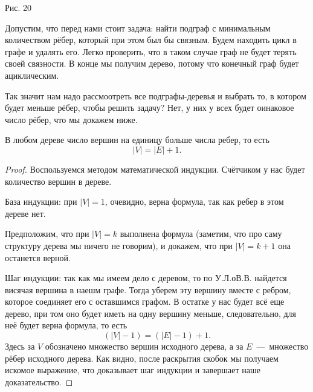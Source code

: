 \begin{center}

	\small Рис. 20
\end{center}


	Допустим, что перед нами стоит задача: найти подграф с минимальным количеством рёбер, который при этом был бы связным. Будем находить цикл в графе и удалять его. Легко проверить, что в таком случае граф не будет терять своей связности. В конце мы получим дерево, потому что конечный граф будет ациклическим.
	
	Так значит нам надо рассмоотреть все подграфы-деревья и выбрать то, в котором будет меньше рёбер, чтобы решить задачу? Нет, у них у всех будет оинаковое число рёбер, что мы докажем ниже.

\begin{statement}
	В любом дереве число вершин на единицу больше числа ребер, то есть $$|V| = |E| + 1.$$
	
\begin{proof}
	Воспользуемся методом математической индукции. Счётчиком у нас будет количество вершин в дереве.
	
	База индукции: при $|V| = 1$, очевидно, верна формула, так как ребер в этом дереве нет.
	
	Предположим, что при $|V| = k$ выполнена формула (заметим, что про саму структуру дерева мы ничего не говорим), и докажем, что при $|V| = k + 1$ она останется верной.
	
	Шаг индукции: так как мы имеем дело с деревом, то по У.Л.оВ.В. найдется висячая вершина в наешм графе. Тогда уберем эту вершину вместе с ребром, которое соединяет его с оставшимся графом. В остатке у нас будет всё еще дерево, при том оно будет иметь на одну вершину меньше, следовательно, для неё будет верна формула, то есть $$\left(|V| - 1\right) = \left(|E| - 1\right) + 1.$$
	Здесь за $V$ обозначено множество вершин исходного дерева, а за $E$~---~множество рёбер исходного дерева. Как видно, после раскрытия скобок мы получаем искомое выражение, что доказывает шаг индукции и завершает наше доказательство.
\end{proof}
\end{statement}

